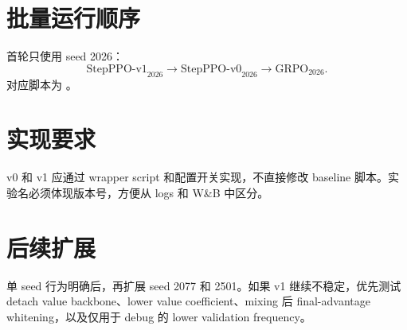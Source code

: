\documentclass[10pt]{ctexart}
\begin{document}
\section*{批量运行顺序}
首轮只使用 seed 2026：
\[
\mathrm{StepPPO\text{-}v1}_{2026}
\rightarrow
\mathrm{StepPPO\text{-}v0}_{2026}
\rightarrow
\mathrm{GRPO}_{2026}.
\]
对应脚本为 。

\section*{实现要求}
v0 和 v1 应通过 wrapper script 和配置开关实现，不直接修改 baseline 脚本。实验名必须体现版本号，方便从 logs 和 W\&B 中区分。

\section*{后续扩展}
单 seed 行为明确后，再扩展 seed 2077 和 2501。如果 v1 继续不稳定，优先测试 detach value backbone、lower value coefficient、mixing 后 final-advantage whitening，以及仅用于 debug 的 lower validation frequency。
\end{document}

